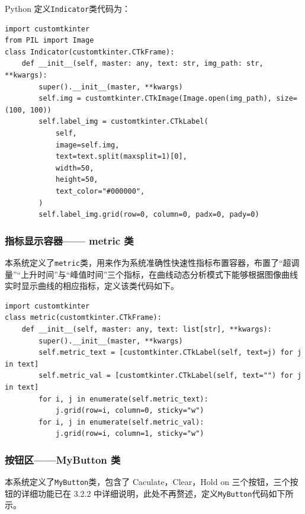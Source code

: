\documentclass[12pt]{ctexart}
\begin{document}
Python 定义\texttt{Indicator}类代码为：

\begin{lstlisting}[title=Indicator 类代码]
import customtkinter
from PIL import Image
class Indicator(customtkinter.CTkFrame):
    def __init__(self, master: any, text: str, img_path: str, **kwargs):
        super().__init__(master, **kwargs)
        self.img = customtkinter.CTkImage(Image.open(img_path), size=(100, 100))
        self.label_img = customtkinter.CTkLabel(
            self,
            image=self.img,
            text=text.split(maxsplit=1)[0],
            width=50,
            height=50,
            text_color="#000000",
        )
        self.label_img.grid(row=0, column=0, padx=0, pady=0)
\end{lstlisting}

\subsubsection{指标显示容器—— metric 类}

本系统定义了\texttt{metric}类，用来作为系统准确性快速性指标布置容器，布置了“超调量”“上升时间”与“峰值时间”三个指标，在曲线动态分析模式下能够根据图像曲线实时显示曲线的相应指标，定义该类代码如下。
\begin{lstlisting}[title=metric 类代码]
import customtkinter
class metric(customtkinter.CTkFrame):
    def __init__(self, master: any, text: list[str], **kwargs):
        super().__init__(master, **kwargs)
        self.metric_text = [customtkinter.CTkLabel(self, text=j) for j in text]
        self.metric_val = [customtkinter.CTkLabel(self, text="") for j in text]
        for i, j in enumerate(self.metric_text):
            j.grid(row=i, column=0, sticky="w")
        for i, j in enumerate(self.metric_val):
            j.grid(row=i, column=1, sticky="w")
\end{lstlisting}

\subsubsection{按钮区——MyButton 类}

本系统定义了\texttt{MyButton}类，包含了 Caculate，Clear，Hold on 三个按钮，三个按钮的详细功能已在 3.2.2 中详细说明，此处不再赘述，定义\texttt{MyButton}代码如下所示。
\end{document}
